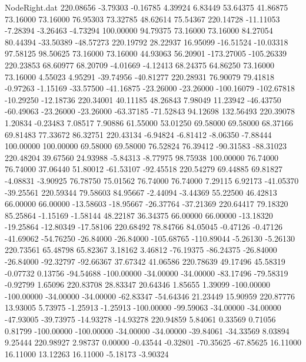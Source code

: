 \begin{filecontents}{NodeRight.dat}
 220.08656   -3.79303   -0.16785     4.39924    6.83449   53.64375   41.86875   73.16000   73.16000   76.95303   73.32785   48.62614   75.54367
 220.14728  -11.11053   -7.28394    -3.26463   -4.73294  100.00000   94.79375   73.16000   73.16000   84.27054   80.44394  -33.50389  -48.57273
 220.19792   28.22937   16.95099   -16.51524  -10.03318   97.58125   98.50625   73.16000   73.16000   44.93063   56.20901 -173.27005 -105.26339
 220.23853   68.60977   68.20709    -4.01669   -4.12413   68.24375   64.86250   73.16000   73.16000    4.55023    4.95291  -39.74956  -40.81277
 220.28931   76.90079   79.41818    -0.97263   -1.15169  -33.57500  -41.16875  -23.26000  -23.26000 -100.16079 -102.67818  -10.29250  -12.18736
 220.34001   40.11185   48.26843     7.98049   11.23942  -46.43750  -60.49063  -23.26000  -23.26000  -63.37185  -71.52843   94.12698  132.56493
 220.39078    1.20834   -0.23483     7.08517    7.90886   61.55000   53.01250   69.58000   69.58000   68.37166   69.81483   77.33672   86.32751
 220.43134   -6.94824   -6.81412    -8.06350   -7.88444  100.00000  100.00000   69.58000   69.58000   76.52824   76.39412  -90.31583  -88.31023
 220.48204   39.67560   24.93988    -5.84313   -8.77975   98.75938  100.00000   76.74000   76.74000   37.06440   51.80012  -61.53107  -92.45518
 220.54279   69.44885   69.81827    -4.08831   -3.90925   76.78750   75.01562   76.74000   76.74000    7.29115    6.92173  -41.05370  -39.25561
 220.59344   79.58603   84.95667    -2.44094   -3.44369   55.22500   46.42813   66.00000   66.00000  -13.58603  -18.95667  -26.37764  -37.21369
 220.64417   79.18320   85.25864    -1.15169   -1.58144   48.22187   36.34375   66.00000   66.00000  -13.18320  -19.25864  -12.80349  -17.58106
 220.68492   78.84766   84.05045    -0.47126   -0.47126  -41.69062  -54.76250  -26.84000  -26.84000 -105.68765 -110.89044   -5.26130   -5.26130
 220.73561   65.48798   65.82367     3.18162    3.46812  -76.19375  -86.24375  -26.84000  -26.84000  -92.32797  -92.66367   37.67342   41.06586
 220.78639   49.17496   45.58319    -0.07732    0.13756  -94.54688 -100.00000  -34.00000  -34.00000  -83.17496  -79.58319   -0.92799    1.65096
 220.83708   28.83347   20.64346     1.85655    1.39099 -100.00000 -100.00000  -34.00000  -34.00000  -62.83347  -54.64346   21.23449   15.90959
 220.87776   13.93005    5.73975    -1.25913   -1.25913 -100.00000  -99.59063  -34.00000  -34.00000  -47.93005  -39.73975  -14.93278  -14.93278
 220.94859    5.84061    0.33569     0.71056    0.81799 -100.00000 -100.00000  -34.00000  -34.00000  -39.84061  -34.33569    8.03894    9.25444
 220.98927    2.98737    0.00000    -0.43544   -0.32801  -70.35625  -67.85625   16.11000   16.11000   13.12263   16.11000   -5.18173   -3.90324

\end{filecontents}
